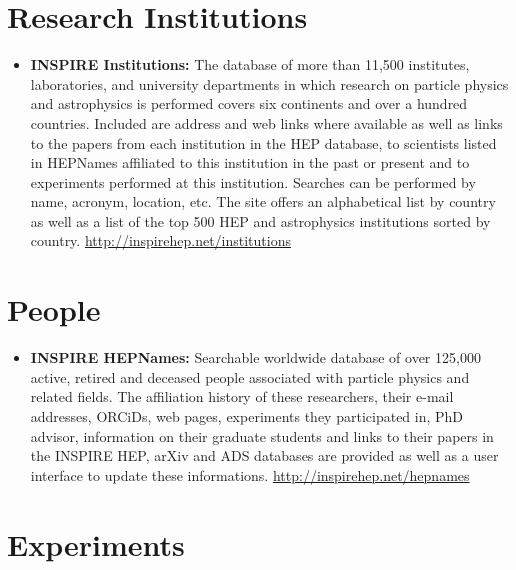 \section{Research Institutions}\label{research-institutions}

\begin{itemize}
\tightlist
\item
  \textbf{INSPIRE Institutions:} The database of more than 11,500
  institutes, laboratories, and university departments in which research
  on particle physics and astrophysics is performed covers six
  continents and over a hundred countries. Included are address and web
  links where available as well as links to the papers from each
  institution in the HEP database, to scientists listed in HEPNames
  affiliated to this institution in the past or present and to
  experiments performed at this institution. Searches can be performed
  by name, acronym, location, etc. The site offers an alphabetical list
  by country as well as a list of the top 500 HEP and astrophysics
  institutions sorted by country.
  \url{http://inspirehep.net/institutions}
\end{itemize}

\section{People}\label{people}

\begin{itemize}
\tightlist
\item
  \textbf{INSPIRE HEPNames:} Searchable worldwide database of over
  125,000 active, retired and deceased people associated with particle
  physics and related fields. The affiliation history of these
  researchers, their e-mail addresses, ORCiDs, web pages, experiments
  they participated in, PhD advisor, information on their graduate
  students and links to their papers in the INSPIRE HEP, arXiv and ADS
  databases are provided as well as a user interface to update these
  informations. \url{http://inspirehep.net/hepnames}
\end{itemize}

\section{Experiments}\label{experiments}

